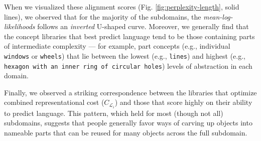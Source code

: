 \documentclass[10pt,letterpaper]{article}
\begin{document}
When we visualized these alignment scores (Fig. \ref{fig:perplexity-length}, solid lines), we observed that for the majority of the subdomains, the \textit{mean-log-likelihoods} follows an \textit{inverted} U-shaped curve.
Moreover, we generally find that the concept libraries that best predict language tend to be those containing parts of intermediate complexity --- for example, part concepts (e.g., individual \texttt{windows} or \texttt{wheels}) that lie between the lowest (e.g., \texttt{lines}) and highest (e.g., \texttt{hexagon with an inner ring of circular holes}) levels of abstraction in each domain.

Finally, we observed a striking correspondence between the libraries that optimize combined representational cost ($C_{\mathcal{L}_i}$) and those that score highly on their ability to predict language. 
This pattern, which held for most (though not all) subdomains, suggests that people generally favor ways of carving up objects into nameable parts that can be reused for many objects across the full subdomain. 


\end{document}
